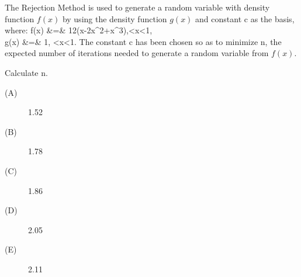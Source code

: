  The Rejection Method is used to generate a random variable with density 
function $f(x)$ by using
the density function $g(x)$ and constant c as the basis, where:
\bears
  f(x) &=& 12(x-2x^2+x^3),\quad{}<x<1, \\
  g(x) &=& 1, \quad{}<x<1.
\eears
The constant c has been chosen so as to minimize n, the expected number of iterations needed to
generate a random variable from $f(x)$.

Calculate n.
\begin{description}
\item[(A)] 1.52
\item[(B)] 1.78
\item[(C)] 1.86
\item[(D)] 2.05
\item[(E)] 2.11
\end{description}
